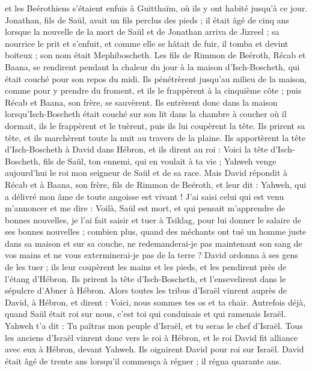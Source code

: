 \begin{multicols}{2}
et les Beérothiens s'étaient enfuis à Guitthaïm, où ils y ont habité jusqu'à ce jour.
Jonathan, fils de Saül, avait un fils perclus des pieds ; il était âgé de cinq ans lorsque la nouvelle de la mort de Saül et de Jonathan arriva de Jizreel ; sa nourrice le prit et s'enfuit, et comme elle se hâtait de fuir, il tomba et devint boiteux ; son nom était Mephiboscheth.
Les fils de Rimmon de Beéroth, Récab et Baana, se rendirent pendant la chaleur du jour à la maison d'Isch-Boscheth, qui était couché pour son repos du midi.
Ils pénétrèrent jusqu'au milieu de la maison, comme pour y prendre du froment, et ils le frappèrent à la cinquième côte ; puis Récab et Baana, son frère, se sauvèrent.
Ils entrèrent donc dans la maison lorsqu'Isch-Boscheth était couché sur son lit dans la chambre à coucher où il dormait, ils le frappèrent et le tuèrent, puis ils lui coupèrent la tête. Ils prirent sa tête, et ils marchèrent toute la nuit au travers de la plaine.
Ils apportèrent la tête d'Isch-Boscheth à David dans Hébron, et ils dirent au roi : Voici la tête d'Isch-Boscheth, fils de Saül, ton ennemi, qui en voulait à ta vie ; Yahweh venge aujourd'hui le roi mon seigneur de Saül et de sa race.
Mais David répondit à Récab et à Baana, son frère, fils de Rimmon de Beéroth, et leur dit : Yahweh, qui a délivré mon âme de toute angoisse est vivant !
J'ai saisi celui qui est venu m'annoncer et me dire : Voilà, Saül est mort, et qui pensait m'apprendre de bonnes nouvelles, je l'ai fait saisir et tuer à Tsiklag, pour lui donner le salaire de ses bonnes nouvelles ;
combien plus, quand des méchants ont tué un homme juste dans sa maison et sur sa couche, ne redemanderai-je pas maintenant son sang de vos mains et ne vous exterminerai-je pas de la terre ?
David ordonna à ses gens de les tuer ; ils leur coupèrent les mains et les pieds, et les pendirent près de l'étang d'Hébron. Ils prirent la tête d'Isch-Boscheth, et l'ensevelirent dans le sépulcre d'Abner à Hébron.
\VerseOne{}Alors toutes les tribus d'Israël vinrent auprès de David, à Hébron, et dirent : Voici, nous sommes tes os et ta chair.
Autrefois déjà, quand Saül était roi sur nous, c'est toi qui conduisais et qui ramenais Israël. Yahweh t'a dit : Tu paîtras mon peuple d'Israël, et tu seras le chef d'Israël.
Tous les anciens d'Israël vinrent donc vers le roi à Hébron, et le roi David fit alliance avec eux à Hébron, devant Yahweh. Ils oignirent David pour roi sur Israël.
David était âgé de trente ans lorsqu'il commença à régner ; il régna quarante ans.

\end{multicols}
